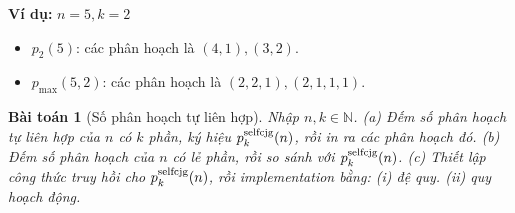 \documentclass{article}
\newtheorem{baitoan}{Bài toán}
\begin{document}
\textbf{Ví dụ:} $n=5, k=2$
\begin{itemize}
    \item $p_2(5)$: các phân hoạch là $(4,1), (3,2)$.
    \item $p_{\max}(5,2)$: các phân hoạch là $(2,2,1), (2,1,1,1)$.
\end{itemize}


\begin{baitoan}[Số phân hoạch tự liên hợp]
    Nhập $n,k\in\mathbb{N}$. (a) Đếm số phân hoạch tự liên hợp của $n$ có $k$ phần, ký hiệu $p_k^{\rm selfcjg}(n)$, rồi in ra các phân hoạch đó. (b) Đếm số phân hoạch của $n$ có lẻ phần, rồi so sánh với $p_k^{\rm selfcjg}(n)$. (c) Thiết lập công thức truy hồi cho $p_k^{\rm selfcjg}(n)$, rồi implementation bằng: (i) đệ quy. (ii) quy hoạch động.
\end{baitoan}
\end{document}
